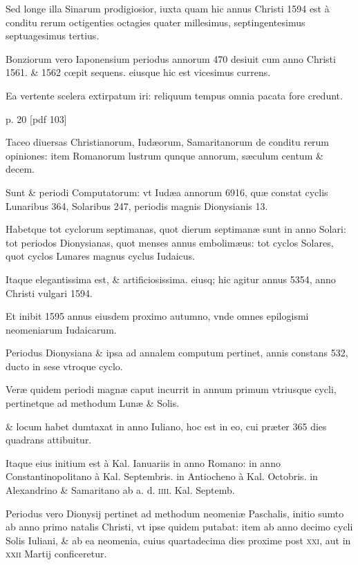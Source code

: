 \begin{parnumbers}
Sed longe illa Sinarum prodigiosior, iuxta quam hic annus Christi
1594 est à conditu rerum octigenties octagies quater millesimus,
septingentesimus septuagesimus tertius.

Bonziorum vero Iaponensium
periodus annorum 470 desiuit cum anno Christi 1561. \& 1562
cœpit sequens. eiusque hic est vicesimus currens.

Ea vertente scelera
extirpatum iri: reliquum tempus omnia pacata fore credunt.

\end{parnumbers}
\clearpage
p. 20 [pdf 103]
\begin{parnumbers}

Taceo
diuersas Christianorum, Iudæorum, Samaritanorum de conditu rerum
opiniones: item Romanorum lustrum qunque annorum, sæculum
centum \& decem.

Sunt \& periodi Computatorum: vt Iudæa  annorum 6916, quæ constat cyclis Lunaribus 364, Solaribus 247, periodis magnis Dionysianis 13.

Habetque tot cyclorum septimanas, quot dierum septimanæ sunt in anno Solari: tot periodos Dionysianas, quot menses annus embolimæus: tot cyclos Solares, quot cyclos Lunares magnus cyclus Iudaicus.

Itaque elegantissima est, \& artificiosissima. eiusq; hic agitur annus 5354, anno Christi vulgari 1594.

Et inibit 1595 annus eiusdem proximo autumno, vnde omnes epilogismi neomeniarum Iudaicarum.

Periodus Dionysiana \& ipsa ad annalem computum pertinet, annis constans 532, ducto in sese vtroque cyclo.

Veræ quidem periodi magnæ caput incurrit in annum primum vtriusque cycli, pertinetque ad methodum Lunæ \& Solis. 

\& locum habet dumtaxat in anno Iuliano, hoc est in eo, cui præter 365 dies quadrans attibuitur.

Itaque eius initium est à Kal. Ianuariis in anno Romano: in anno Constantinopolitano à Kal. Septembris. in Antiocheno à Kal. Octobris. in Alexandrino \& Samaritano ab a. d. \textsc{iiii}. Kal. Septemb.

Periodus vero Dionysij pertinet ad methodum neomeniæ Paschalis, initio sumto ab anno primo natalis Christi, vt ipse quidem putabat: item ab anno decimo cycli Solis Iuliani, \& ab ea neomenia, cuius quartadecima dies proxime post \textsc{xxi}, aut in \textsc{xxii} Martij conficeretur.


\end{parnumbers}
